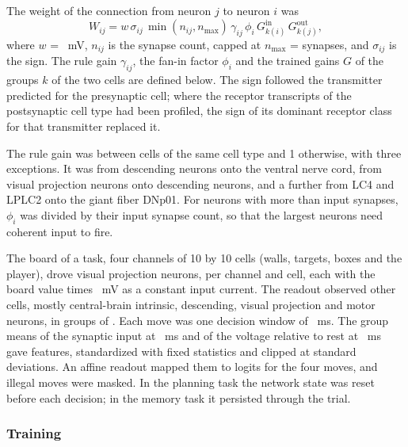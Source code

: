 The weight of the connection from neuron $j$ to neuron $i$ was
\begin{equation*}
W_{ij} = w\,\sigma_{ij}\,\min(n_{ij}, n_{\max})\,\gamma_{ij}\,\phi_i\,G^{\mathrm{in}}_{k(i)}\,G^{\mathrm{out}}_{k(j)},
\end{equation*}
where $w$ = ~mV, $n_{ij}$ is the synapse count, capped at $n_{\max}$ =  synapses, and $\sigma_{ij}$ is the
sign. The rule gain $\gamma_{ij}$, the fan-in factor $\phi_i$ and the trained gains $G$ of the groups $k$ of the two cells are
defined below. The sign followed the transmitter predicted for the presynaptic cell; where the receptor
transcripts of the postsynaptic cell type had been profiled,
the sign of its dominant receptor class for that transmitter replaced it.

The rule gain was  between cells of the same cell type and 1 otherwise, with three exceptions. It was 
from descending neurons onto the ventral nerve cord,  from visual projection neurons onto descending neurons, and
a further  from LC4 and LPLC2 onto the giant fiber DNp01. For neurons with more than  input
synapses, $\phi_i$ was  divided by their input synapse count, so that the largest neurons need coherent input to
fire.

The board of a task, four channels of 10 by 10 cells (walls, targets, boxes and the player), drove  visual projection
neurons,  per channel and cell, each with the board value times ~mV as a constant input current. The
readout observed  other cells, mostly central-brain intrinsic, descending, visual projection and motor neurons, in
 groups of . Each move was one decision window of ~ms. The group means of the synaptic input
at ~ms and of the voltage relative to rest at ~ms gave  features, standardized with fixed
statistics and clipped at  standard deviations. An affine readout mapped them to logits for the four moves, and
illegal moves were masked. In the planning task the network state was reset before each decision; in the memory task it
persisted through the trial.

\subsubsection{Training}

